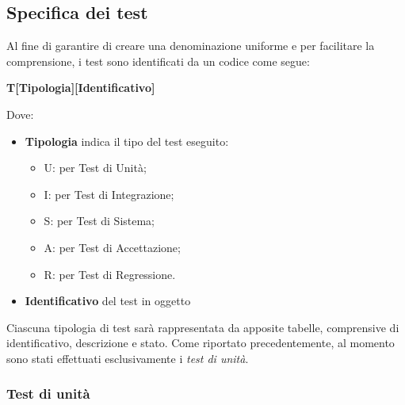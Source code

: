 \subsection{Specifica dei test}
Al fine di garantire di creare una denominazione uniforme e per facilitare la comprensione, i test sono identificati da un codice come segue:
\begin{center}
    \textbf{T[Tipologia][Identificativo]}
\end{center}
Dove:
\begin{itemize}
    \item \textbf{Tipologia} indica il tipo del test eseguito:
    \begin{itemize}
        \item U: per Test di Unità;
        \item I: per Test di Integrazione;
        \item S: per Test di Sistema;
        \item A: per Test di Accettazione;
        \item R: per Test di Regressione.
    \end{itemize}
    \item \textbf{Identificativo} del test in oggetto
\end{itemize}
Ciascuna tipologia di test sarà rappresentata da apposite tabelle, comprensive di identificativo, descrizione e stato. Come riportato precedentemente, al momento sono stati effettuati esclusivamente i \textit{test di unità}.

\subsubsection{Test di unità}

